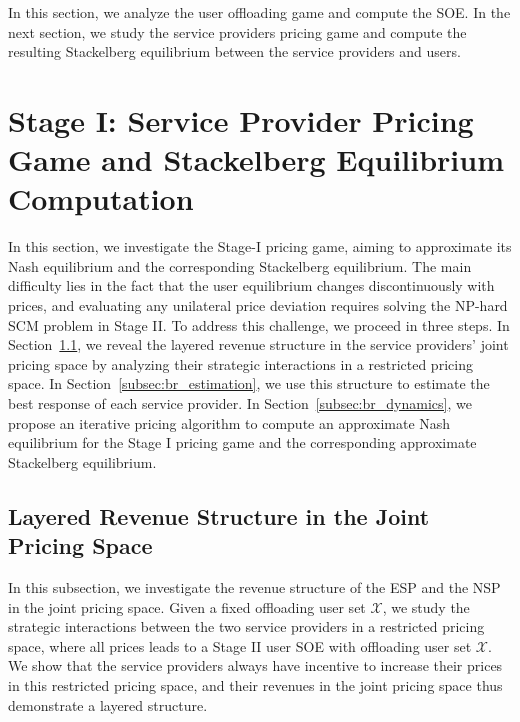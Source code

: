 \documentclass[lettersize,journal]{IEEEtran}
\begin{document}
In this section, we analyze the user offloading game and compute the SOE. In the next section, we study the service providers pricing game and compute the resulting Stackelberg equilibrium between the service providers and users.


\section{Stage I: Service Provider Pricing Game and Stackelberg Equilibrium Computation}
\label{Section:Stage-I}

In this section, we investigate the Stage-I pricing game, aiming to approximate its Nash equilibrium and the corresponding Stackelberg equilibrium.
The main difficulty lies in the fact that the user equilibrium changes discontinuously with prices, and evaluating any unilateral price deviation requires solving the NP-hard SCM problem in Stage II.
To address this challenge, we proceed in three steps.
In Section~\ref{subsec:res-pricing-game}, we reveal the layered revenue structure in the service providers' joint pricing space by analyzing their strategic interactions in a restricted pricing space.
In Section~\ref{subsec:br_estimation}, we use this structure to estimate the best response of each service provider.
In Section~\ref{subsec:br_dynamics}, we propose an iterative pricing algorithm to compute an approximate Nash equilibrium for the Stage I pricing game and the corresponding approximate Stackelberg equilibrium.

\subsection{Layered Revenue Structure in the Joint Pricing Space}\label{subsec:res-pricing-game}
In this subsection, we investigate the revenue structure of the ESP and the NSP in the joint pricing space.  Given a fixed offloading user set $\mathcal{X}$, we study the strategic interactions between the two service providers in a restricted pricing space, where all prices leads to a Stage II user SOE with offloading user set $\mathcal{X}$. 
We show that the service providers always have incentive to increase their prices in this restricted pricing space, and their revenues in the joint pricing space thus demonstrate a layered structure.
\end{document}

